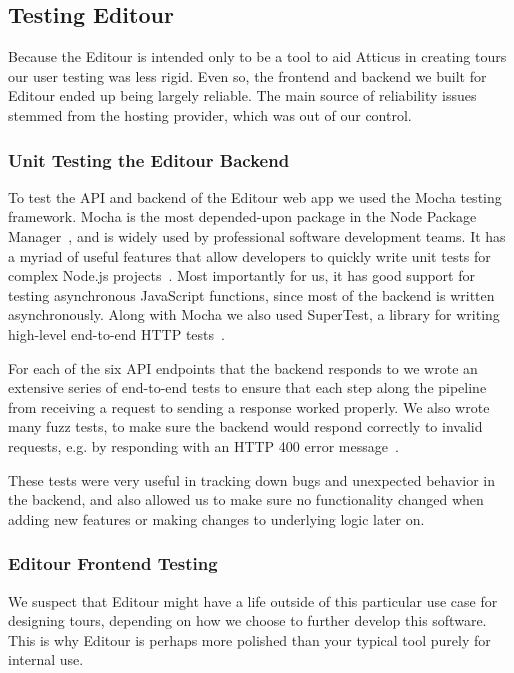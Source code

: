 \documentclass[a4paper, 10pt, american, titlepage]{article}
\begin{document}
\subsection{Testing Editour}
\label{sec:testingEditour}

Because the Editour is intended only to be a tool to aid Atticus in creating
tours our user testing was less rigid. Even so, the frontend and backend we
built for Editour ended up being largely reliable. The main source of
reliability issues stemmed from the hosting provider, which was out of our
control.

\subsubsection{Unit Testing the Editour Backend}
\label{sec:unitTestingTheEditourBackend}

To test the API and backend of the Editour web app we used the Mocha testing
framework. Mocha is the most depended-upon package in the Node Package
Manager~\autocite{tidelift2019}, and is widely used by professional software
development teams. It has a myriad of useful features that allow developers to
quickly write unit tests for complex Node.js projects~\autocite{mochajs2019}.
Most importantly for us, it has good support for testing asynchronous JavaScript
functions, since most of the backend is written asynchronously. Along with Mocha
we also used SuperTest, a library for writing high-level end-to-end HTTP
tests~\autocite{supertest2019}.

For each of the six API endpoints that the backend responds to we wrote an
extensive series of end-to-end tests to ensure that each step along the pipeline
from receiving a request to sending a response worked properly. We also wrote
many fuzz tests, to make sure the backend would respond correctly to invalid
requests, e.g. by responding with an HTTP 400 error message~\autocite{rfc7231}.

These tests were very useful in tracking down bugs and unexpected behavior in
the backend, and also allowed us to make sure no functionality changed when
adding new features or making changes to underlying logic later on.

\subsubsection{Editour Frontend Testing}
\label{sec:editourFrontendTesting}

We suspect that Editour might have a life outside of this particular use case
for designing tours, depending on how we choose to further develop this
software. This is why Editour is perhaps more polished than your typical tool
purely for internal use.
\end{document}
